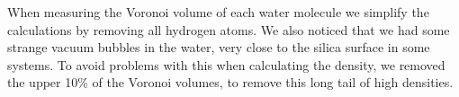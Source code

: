 When measuring the Voronoi volume of each water molecule we simplify the calculations by removing all hydrogen atoms. We also noticed that we had some strange vacuum bubbles in the water, very close to the silica surface in some systems. To avoid problems with this when calculating the density, we removed the upper 10\% of the Voronoi volumes, to remove this long tail of high densities.



